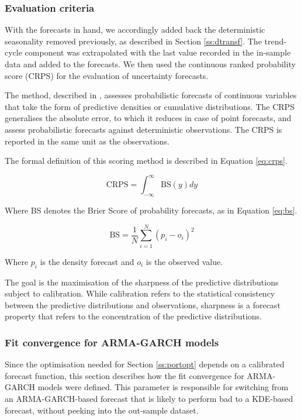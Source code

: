 \documentclass[preprint,3p,11pt,authoryear]{elsarticle}
\begin{document}
\subsubsection{Evaluation criteria}
\label{sss:eval}
With the forecasts in hand, we accordingly added back the deterministic seasonality removed previously, as described in Section \ref{ss:dtransf}.
The trend-cycle component was extrapolated with the last value recorded in the in-sample data and added to the forecasts.
We then used the continuous ranked probability score (CRPS) for the evaluation of uncertainty forecasts.

The method, described in \citet{GBR2007crps}, assesses probabilistic forecasts of continuous variables that take the form of predictive densities or cumulative distributions.
The CRPS generalises the absolute error, to which it reduces in case of point forecasts, and assess probabilistic forecasts against deterministic observations.
The CRPS is reported in the same unit as the observations.

The formal definition of this scoring method is described in Equation \ref{eq:crps}.

\begin{equation}
   \text{CRPS} = \int_{-\infty}^{\infty} \text{BS}(y) dy
   \label{eq:crps}
\end{equation}

Where BS denotes the Brier Score \citep{brier1950verification} of probability forecasts, as in Equation \ref{eq:bs}.

\begin{equation}
   \text{BS} = \frac{1}{N} \sum_{i=1}^N {(p_i - o_i)}^2
   \label{eq:bs}
\end{equation}

Where $p_i$ is the density forecast and $o_i$ is the observed value.

The goal is the maximisation of the sharpness of the predictive distributions subject to calibration.
While calibration refers to the statistical consistency between the predictive distributions and observations, sharpness is a forecast property that refers to the concentration of the predictive distributions.

\subsubsection{Fit convergence for ARMA-GARCH models}
\label{sss:gof.min}
Since the optimisation needed for Section \ref{ss:portopt} depends on a calibrated forecast function, this section describes how the fit convergence for ARMA-GARCH models were defined.
This parameter is responsible for switching from an ARMA-GARCH-based forecast that is likely to perform bad to a KDE-based forecast, without peeking into the out-sample dataset.
\end{document}
